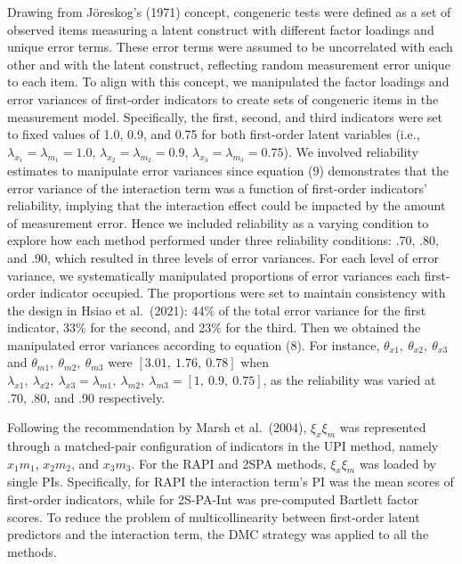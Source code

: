 \documentclass[
  man]{apa6}
\begin{document}
Drawing from Jöreskog's (1971) concept, congeneric tests were defined as a set of observed items measuring a latent construct with different factor loadings and unique error terms. These error terms were assumed to be uncorrelated with each other and with the latent construct, reflecting random measurement error unique to each item. To align with this concept, we manipulated the factor loadings and error variances of first-order indicators to create sets of congeneric items in the measurement model. Specifically, the first, second, and third indicators were set to fixed values of 1.0, 0.9, and 0.75 for both first-order latent variables (i.e., \(\lambda_{x_{1}} = \lambda_{m_{1}} = 1.0\), \(\lambda_{x_{2}} = \lambda_{m_{2}} = 0.9\), \(\lambda_{x_{3}} = \lambda_{m_{3}} = 0.75\)). We involved reliability estimates to manipulate error variances since equation (9) demonstrates that the error variance of the interaction term was a function of first-order indicators' reliability, implying that the interaction effect could be impacted by the amount of measurement error. Hence we included reliability as a varying condition to explore how each method performed under three reliability conditions: .70, .80, and .90, which resulted in three levels of error variances. For each level of error variance, we systematically manipulated proportions of error variances each first-order indicator occupied. The proportions were set to maintain consistency with the design in Hsiao et al.~(2021): 44\(\%\) of the total error variance for the first indicator, 33\(\%\) for the second, and 23\(\%\) for the third. Then we obtained the manipulated error variances according to equation (8). For instance, \(\theta_{x1}, \ \theta_{x2}, \ \theta_{x3}\) and \(\theta_{m1}, \ \theta_{m2}, \ \theta_{m3}\) were \([3.01, \ 1.76, \ 0.78]\) when \(\lambda_{x1}, \ \lambda_{x2}, \ \lambda_{x3} = \lambda_{m1}, \ \lambda_{m2}, \ \lambda_{m3} = [1, \ 0.9, \ 0.75]\), as the reliability was varied at .70, .80, and .90 respectively.

Following the recommendation by Marsh et al.~(2004), \(\xi_{x}\xi_{m}\) was represented through a matched-pair configuration of indicators in the UPI method, namely \(x_{1}m_{1}\), \(x_{2}m_{2}\), and \(x_{3}m_{3}\). For the RAPI and 2SPA methods, \(\xi_{x}\xi_{m}\) was loaded by single PIs. Specifically, for RAPI the interaction term's PI was the mean scores of first-order indicators, while for 2S-PA-Int was pre-computed Bartlett factor scores. To reduce the problem of multicollinearity between first-order latent predictors and the interaction term, the DMC strategy was applied to all the methods.
\end{document}
